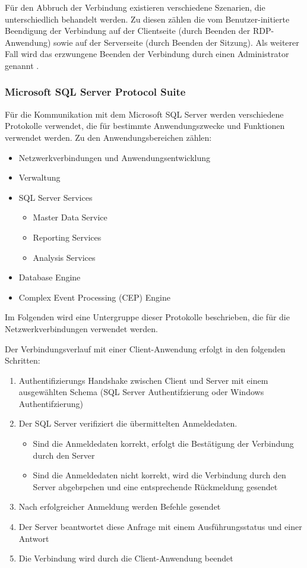 Für den Abbruch der Verbindung existieren verschiedene Szenarien, die unterschiedlich behandelt werden. Zu diesen zählen die vom Benutzer-initierte Beendigung der Verbindung auf der Clientseite (durch Beenden der RDP-Anwendung) sowie auf der Serverseite (durch Beenden der Sitzung). Als weiterer Fall wird das erzwungene Beenden der Verbindung durch einen Administrator genannt \citep{RDP2}. 


\subsubsection{Microsoft SQL Server Protocol Suite}
Für die Kommunikation mit dem Microsoft SQL Server werden verschiedene Protokolle verwendet, die für bestimmte Anwendungszwecke und Funktionen verwendet werden. Zu den Anwendungsbereichen zählen:
\begin{itemize}
\item Netzwerkverbindungen und Anwendungsentwicklung
\item Verwaltung
\item SQL Server Services
\begin{itemize}
\item Master Data Service
\item Reporting Services
\item Analysis Services
\end{itemize}
\item Database Engine
\item Complex Event Processing (CEP) Engine
\end{itemize}
\citep{SQLProt1}
Im Folgenden wird eine Untergruppe dieser Protokolle beschrieben, die für die Netzwerkverbindungen verwendet werden. 

Der Verbindungsverlauf mit einer Client-Anwendung erfolgt in den folgenden Schritten:
\begin{enumerate}
\item Authentifizierungs Handshake zwischen Client und Server mit einem ausgewählten Schema (SQL Server Authentifzierung oder Windows Authentifzierung)
\item Der SQL Server verifiziert die übermittelten Anmeldedaten. 
\begin{itemize}
\item Sind die Anmeldedaten korrekt, erfolgt die Bestätigung der Verbindung durch den Server
\item Sind die Anmeldedaten nicht korrekt, wird die Verbindung durch den Server abgebrpchen und eine entsprechende Rückmeldung gesendet
\end{itemize}
\item Nach erfolgreicher Anmeldung werden Befehle gesendet
\item Der Server beantwortet diese Anfrage mit einem Ausführungsstatus und einer Antwort
\item Die Verbindung wird durch die Client-Anwendung beendet
\end{enumerate}
\citep{SQLProt1}

